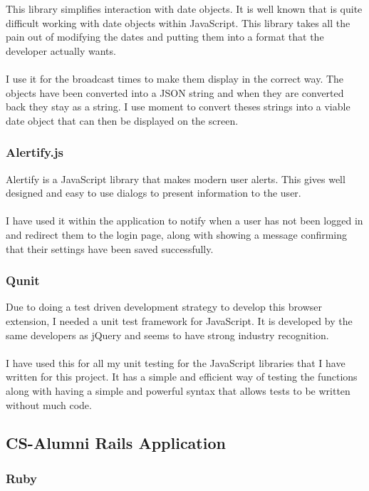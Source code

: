 \documentclass{article}
\begin{document}
This library simplifies interaction with date objects. It is well known that is quite difficult working with date objects within JavaScript. This library takes all the pain out of modifying the dates and putting them into a format that the developer actually wants.\\
\\
I use it for the broadcast times to make them display in the correct way. The objects have been converted into a JSON string and when they are converted back they stay as a string. I use moment to convert theses strings into a viable date object that can then be displayed on the screen.

\subsubsection{Alertify.js}

Alertify is a JavaScript library that makes modern user alerts. This gives well designed and easy to use dialogs to present information to the user.\\
\\ 
I have used it within the application to notify when a user has not been logged in and redirect them to the login page, along with showing a message confirming that their settings have been saved successfully.

\subsubsection{Qunit}

Due to doing a test driven development strategy to develop this browser extension, I needed a unit test framework for JavaScript. It is developed by the same developers as jQuery and seems to have strong industry recognition.\\
\\
I have used this for all my unit testing for the JavaScript libraries that I have written for this project. It has a simple and efficient way of testing the functions along with having a simple and powerful syntax that allows tests to be written without much code.

\subsection{CS-Alumni Rails Application}

\subsubsection{Ruby}
\end{document}

